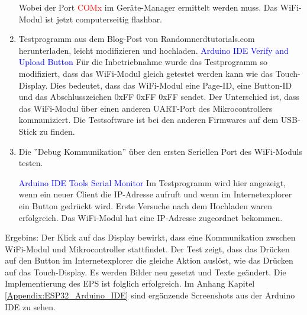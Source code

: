 \begin{enumerate}
Wobei der Port \textcolor{red}{COMx} im Geräte-Manager ermittelt werden muss. Das WiFi-Modul ist jetzt computerseitig flashbar.\newpage

\item Testprogramm aus dem Blog-Post von Randomnerdtutorials.com herunterladen, leicht modifizieren und hochladen. \cite{santos_esp32_2018}\newline
\textcolor{blue}{Arduino IDE \textrightarrow Verify and Upload Button} \newline
Für die Inbetriebnahme wurde das Testprogramm so modifiziert, dass das WiFi-Modul gleich getestet werden kann wie das Touch-Display. Dies bedeutet, dass das WiFi-Modul eine Page-ID, eine Button-ID und das Abschlusszeichen 0xFF 0xFF 0xFF sendet. Der Unterschied ist, dass das WiFi-Modul über einen anderen UART-Port des Mikrocontrollers kommuniziert. Die Testsoftware ist bei den anderen Firmwares auf dem USB-Stick zu finden.\newline

\item Die ''Debug Kommunikation'' über den ersten Seriellen Port des WiFi-Moduls testen.

\textcolor{blue}{Arduino IDE \textrightarrow Tools \textrightarrow Serial Monitor}\newline
Im Testprogramm wird hier angezeigt, wenn ein neuer Client die IP-Adresse aufruft und wenn im Internetexplorer ein Button gedrückt wird. Erste Versuche nach dem Hochladen waren erfolgreich. Das WiFi-Modul hat eine IP-Adresse zugeordnet bekommen.
\end{enumerate}

Ergebins: Der Klick auf das Display bewirkt, dass eine Kommunikation zwschen WiFi-Modul und Mikrocontroller stattfindet. Der Test zeigt, dass das Drücken auf den Button im Internetexplorer die gleiche Aktion auslöst, wie das Drücken auf das Touch-Display. Es werden Bilder neu gesetzt und Texte geändert. Die Implementierung des EPS ist folglich erfolgreich. Im Anhang Kapitel \ref{Appendix:ESP32_Arduino_IDE} sind ergänzende Screenshots aus der Arduino IDE zu sehen.